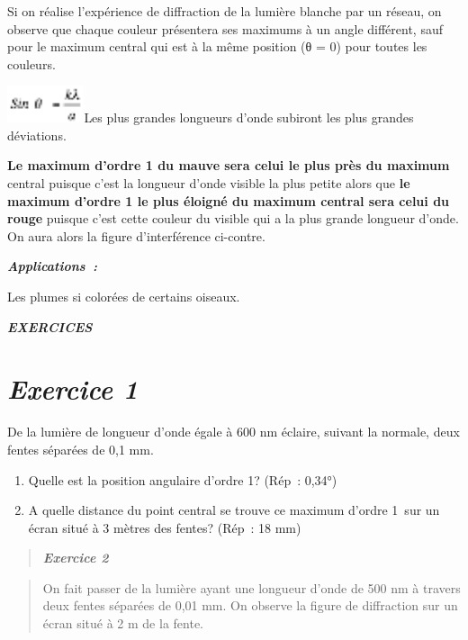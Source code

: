 Si on réalise l'expérience de diffraction de la lumière blanche par un
réseau, on observe que chaque couleur présentera ses maximums à un angle
différent, sauf pour le maximum central qui est à la même position (θ =
0) pour toutes les couleurs.

\includegraphics[width=2.259cm,height=1.082cm]{Pictures/100000010000002C0000001558E0CCA95D4F59EB.png}Les
plus grandes longueurs d'onde subiront les plus grandes déviations.

\textbf{Le maximum d'ordre 1 du mauve sera celui le plus près du
maximum} central puisque c'est la longueur d'onde visible la plus petite
alors que \textbf{le maximum d'ordre 1 le plus éloigné du maximum
central sera celui du rouge} puisque c'est cette couleur du visible qui
a la plus grande longueur d'onde. On aura alors la figure d'interférence
ci-contre.

\emph{\textbf{Applications~: }}

Les plumes si colorées de certains oiseaux.

\emph{\textbf{EXERCICES}}

\hypertarget{exercice-1}{%
\section{\texorpdfstring{\emph{Exercice
1}}{Exercice 1}}\label{exercice-1}}

De la lumière de longueur d'onde égale à 600 nm éclaire, suivant la
normale, deux fentes séparées de 0,1 mm.

\begin{enumerate}
\def\labelenumi{\alph{enumi})}
\tightlist
\item
  Quelle est la position angulaire d'ordre 1? (Rép~: 0,34°)
\item
  A quelle distance du point central se trouve ce maximum d'ordre 1~sur
  un écran situé à 3 mètres des fentes? (Rép~: 18 mm)
\end{enumerate}

\begin{quote}
\emph{\textbf{Exercice 2}}
\end{quote}

\begin{quote}
\end{quote}

\begin{quote}
On fait passer de la lumière ayant une longueur d'onde de 500 nm à
travers deux fentes séparées de 0,01 mm. On observe la figure de
diffraction sur un écran situé à 2 m de la fente.
\end{quote}

